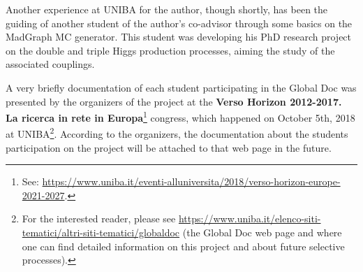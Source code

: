 Another experience at UNIBA for the author, though shortly, has been the guiding of another student of the author's co-advisor through some basics on the MadGraph MC generator. This student was developing his PhD research project on the double and triple Higgs production processes, aiming the study of the associated couplings.

A very briefly documentation of each student participating in the Global Doc was presented by the organizers of the project at the \textbf{Verso Horizon 2012-2017. La ricerca in rete in Europa}\footnote{See:  \url{https://www.uniba.it/eventi-alluniversita/2018/verso-horizon-europe-2021-2027}.} congress, which happened on October 5th, 2018 at UNIBA\footnote{For the interested reader, please see \url{https://www.uniba.it/elenco-siti-tematici/altri-siti-tematici/globaldoc} (the Global Doc web page and where one can find detailed information on this project and about future selective processes).}. According to the organizers, the documentation about the students participation on the project will be attached to that web page in the future.